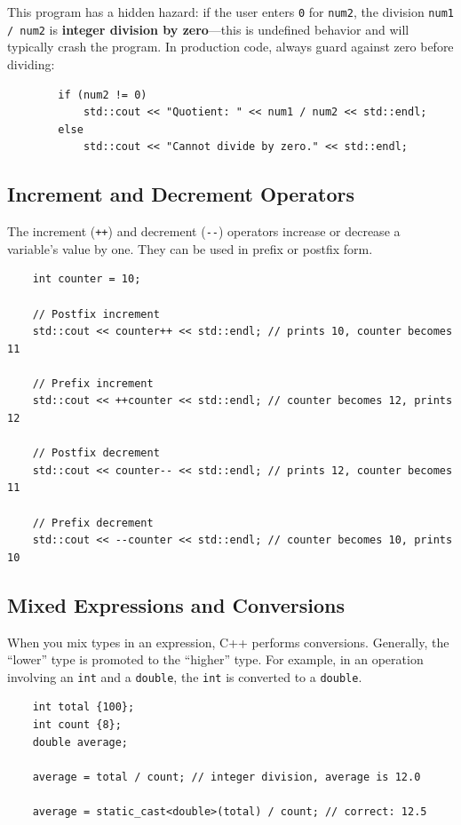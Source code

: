 \begin{remark}
	This program has a hidden hazard: if the user enters \texttt{0} for \texttt{num2}, the division \texttt{num1 / num2} is \textbf{integer division by zero}—this is undefined behavior and will typically crash the program. In production code, always guard against zero before dividing:
	\begin{lstlisting}
		if (num2 != 0)
			std::cout << "Quotient: " << num1 / num2 << std::endl;
		else
			std::cout << "Cannot divide by zero." << std::endl;
	\end{lstlisting}
\end{remark}

\subsection{Increment and Decrement Operators}
The increment (\texttt{++}) and decrement (\texttt{-{}-}) operators increase or decrease a variable's value by one. They can be used in prefix or postfix form.
\begin{lstlisting}
	int counter = 10;

	// Postfix increment
	std::cout << counter++ << std::endl; // prints 10, counter becomes 11

	// Prefix increment
	std::cout << ++counter << std::endl; // counter becomes 12, prints 12

	// Postfix decrement
	std::cout << counter-- << std::endl; // prints 12, counter becomes 11

	// Prefix decrement
	std::cout << --counter << std::endl; // counter becomes 10, prints 10
\end{lstlisting}

\subsection{Mixed Expressions and Conversions}
When you mix types in an expression, C++ performs conversions. Generally, the ``lower'' type is promoted to the ``higher'' type. For example, in an operation involving an \texttt{int} and a \texttt{double}, the \texttt{int} is converted to a \texttt{double}.
\begin{lstlisting}
	int total {100};
	int count {8};
	double average;

	average = total / count; // integer division, average is 12.0

	average = static_cast<double>(total) / count; // correct: 12.5
\end{lstlisting}

